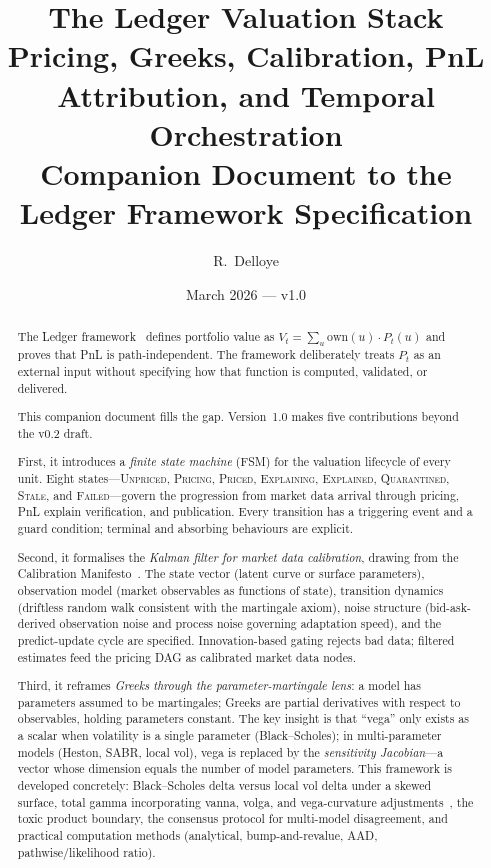\documentclass[11pt,a4paper]{article}
\title{The Ledger Valuation Stack\\[6pt]
\large Pricing, Greeks, Calibration, PnL Attribution, and Temporal Orchestration\\[4pt]
\normalsize Companion Document to the Ledger Framework Specification}
\author{R.\ Delloye}
\date{March 2026 --- v1.0}
\begin{document}
\maketitle

\begin{abstract}
The Ledger framework~\cite{ledger} defines portfolio value as $V_t = \sum_u \mathrm{own}(u) \cdot P_t(u)$ and proves that PnL is path-independent.  The framework deliberately treats $P_t$ as an external input without specifying how that function is computed, validated, or delivered.

This companion document fills the gap.  Version~1.0 makes five contributions beyond the v0.2 draft.

First, it introduces a \emph{finite state machine} (FSM) for the valuation lifecycle of every unit.  Eight states---\textsc{Unpriced}, \textsc{Pricing}, \textsc{Priced}, \textsc{Explaining}, \textsc{Explained}, \textsc{Quarantined}, \textsc{Stale}, and \textsc{Failed}---govern the progression from market data arrival through pricing, PnL explain verification, and publication.  Every transition has a triggering event and a guard condition; terminal and absorbing behaviours are explicit.

Second, it formalises the \emph{Kalman filter for market data calibration}, drawing from the Calibration Manifesto~\cite{calibration_manifesto}.  The state vector (latent curve or surface parameters), observation model (market observables as functions of state), transition dynamics (driftless random walk consistent with the martingale axiom), noise structure (bid-ask-derived observation noise and process noise governing adaptation speed), and the predict-update cycle are specified.  Innovation-based gating rejects bad data; filtered estimates feed the pricing DAG as calibrated market data nodes.

Third, it reframes \emph{Greeks through the parameter-martingale lens}: a model has parameters assumed to be martingales; Greeks are partial derivatives with respect to observables, holding parameters constant.  The key insight is that ``vega'' only exists as a scalar when volatility is a single parameter (Black--Scholes); in multi-parameter models (Heston, SABR, local vol), vega is replaced by the \emph{sensitivity Jacobian}---a vector whose dimension equals the number of model parameters.  This framework is developed concretely: Black--Scholes delta versus local vol delta under a skewed surface, total gamma incorporating vanna, volga, and vega-curvature adjustments~\cite{pnl_total_gamma,total_gamma}, the toxic product boundary, the consensus protocol for multi-model disagreement, and practical computation methods (analytical, bump-and-revalue, AAD, pathwise/likelihood ratio).


\end{abstract}
\end{document}

